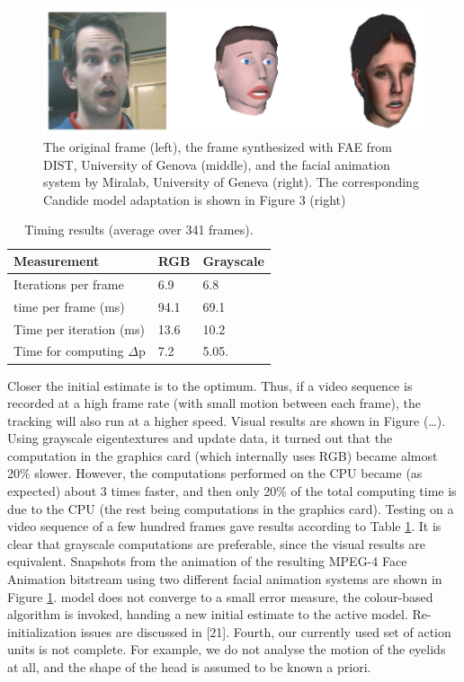 \documentclass[12pt]{spieman}
\begin{document}
\begin{spacing}{2}
\begin{figure}[H]
    \centering
    \includegraphics[width=120mm]{Figure2.jpg}
    \caption{The original frame (left), the frame synthesized with FAE from DIST, University of Genova (middle), and the facial animation system by Miralab, University of Geneva (right). The corresponding Candide model adaptation is shown in Figure 3 (right)}
    \label{fig2}
\end{figure}

\begin{table}[H]
\caption{Timing results (average over 341 frames).} 
\label{tab1}
\begin{center}       
\begin{tabular}{|l|l|l|} 
\hline
\rule[-1ex]{0pt}{3.5ex}  Measurement & RGB & Grayscale \\
\hline\hline
\rule[-1ex]{0pt}{3.5ex}  Iterations per frame & 6.9 & 6.8  \\
\hline
\rule[-1ex]{0pt}{3.5ex} time per frame (ms) & 94.1 & 69.1 \\
\hline
\rule[-1ex]{0pt}{3.5ex}  Time per iteration (ms) & 13.6 & 10.2   \\
\hline
\rule[-1ex]{0pt}{3.5ex} Time for computing $\Delta$p & 7.2 & 5.05. \\
\hline 
\end{tabular}
\end{center}
\end{table}
Closer the initial estimate is to the optimum. Thus, if a video sequence is recorded at a high frame rate (with small motion between each frame), the tracking will also run at a higher speed. Visual results are shown in Figure (…). Using grayscale eigentextures and update data, it turned out that the computation in the graphics card (which internally uses RGB) became almost 20\% slower. However, the computations performed on the CPU became (as expected) about 3 times faster, and then only 20\% of the total computing time is due to the CPU (the rest being computations in the graphics card). Testing on a video sequence of a few hundred frames gave results according to Table \ref{tab1}. It is clear that grayscale computations are preferable, since the visual results are equivalent. Snapshots from the animation of the resulting MPEG-4 Face Animation bitstream using two different facial animation systems are shown in Figure \ref{fig2}. model does not converge to a small error measure, the colour-based algorithm is invoked, handing a new initial estimate to the active model. Re-initialization issues are discussed in [21]. Fourth, our currently used set of action units is not complete. For example, we do not analyse the motion of the eyelids at all, and the shape of the head is assumed to be known a priori.


\end{spacing}
\end{document}
